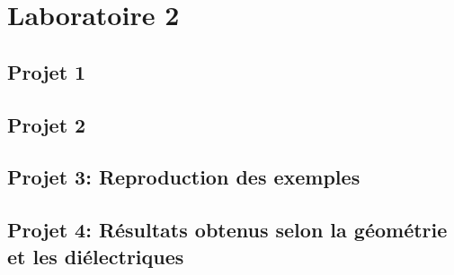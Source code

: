 



\label{s:experimentation}
\chapter{Laboratoire 2}
\section{Projet 1}

\newpage
\section{Projet 2}
\newpage

\section{Projet 3: Reproduction des exemples}
\newpage
\section{Projet 4: Résultats obtenus selon la géométrie et les diélectriques}


